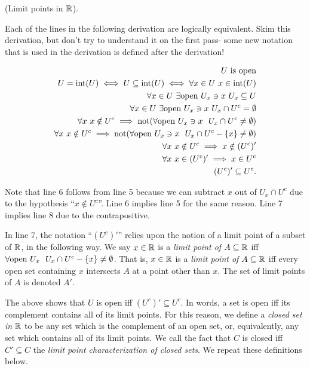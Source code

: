 \begin{deriv}
    (Limit points in $\mathbb{R}$).
    
    Each of the lines in the following derivation are logically equivalent. Skim this derivation, but don't try to understand it on the first pass- some new notation that is used in the derivation is defined after the derivation!
    
    \begin{align*}
        U \text{ is open} \\
        U = \text{int}(U) \iff U \subseteq \text{int}(U) \iff
        \forall x \in U \text{ } x \in \text{int}(U) \\
        \forall x \in U \text{ } \exists \text{open } U_x \ni x \text{ } U_x \subseteq U \\
        \forall x \in U \text{ } \exists \text{open } U_x \ni x \text{ } U_x \cap U^c = \emptyset \\
        \forall x \text{ } x \notin U^c \implies \text{not}(\forall \text{open } U_x \ni x \text{ } \text{ } U_x \cap U^c \neq \emptyset) \\
        \forall x \text{ } x \notin U^c \implies \text{not}(\forall \text{open } U_x \ni x \text{ } \text{ } U_x \cap U^c - \{x\} \neq \emptyset) \\
        \forall x \text{ } x \notin U^c \implies x \notin (U^c)' \\
        \forall x \text{ } x \in (U^c)' \implies x \in U^c \\
        (U^c)' \subseteq U^c.
    \end{align*}
    
    Note that line 6 follows from line 5 because we can subtract $x$ out of $U_x \cap U^c$ due to the hypothesis ``$x \notin U^c$''. Line 6 implies line 5 for the same reason. Line 7 implies line 8 due to the contrapositive.
    
    In line 7, the notation ``$(U^c)'$'' relies upon    the notion of a limit point of a subset of $\mathbb{R}$, in the following way. We say $x \in \mathbb{R}$ is a \textit{limit point of $A \subseteq \mathbb{R}$} iff  $\forall \text{open } U_x \text{ } \text{ } U_x \cap U^c - \{x\} \neq \emptyset$. That is, $x \in \mathbb{R}$ is a \textit{limit point of $A \subseteq \mathbb{R}$} iff every open set containing $x$ intersects $A$ at a point other than $x$. The set of limit points of $A$ is denoted $A'$.
    
    The above shows that $U$ is open iff $(U^c)' \subseteq U^c$. In words, a set is open iff its complement contains all of its limit points. For this reason, we define a \textit{closed set in} $\mathbb{R}$ to be any set which is the complement of an open set, or, equivalently, any set which contains all of its limit points. We call the fact that $C$ is closed iff $C' \subseteq C$ the \textit{limit point characterization of closed sets}. We repeat these definitions below.
\end{deriv}

